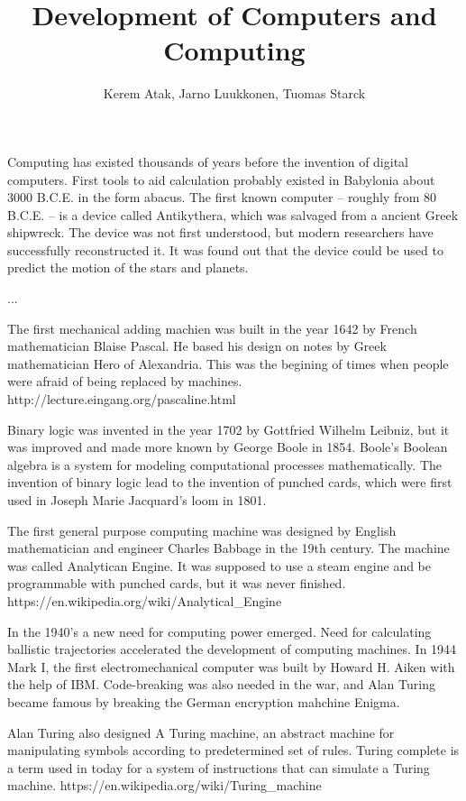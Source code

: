 \documentclass[a4paper,12pt]{article}
\begin{document}
\title{Development of Computers and Computing}
\author{Kerem Atak, Jarno Luukkonen, Tuomas Starck}
\maketitle

Computing has existed thousands of years before the invention of digital computers. First tools to aid calculation probably existed in Babylonia about 3000 B.C.E. in the form abacus\cite{js95}. The first known computer -- roughly from 80 B.C.E. -- is a device called Antikythera, which was salvaged from a ancient Greek shipwreck. The device was not first understood, but modern researchers have successfully reconstructed it. It was found out that the device could be used to predict the motion of the stars and planets\cite{amrp}.

...

The first mechanical adding machien was built in the year 1642 by French mathematician Blaise Pascal. He based his design on notes by Greek mathematician Hero of Alexandria. This was the begining of times when people were afraid of being replaced by machines.  http://lecture.eingang.org/pascaline.html

Binary logic was invented in the year 1702 by Gottfried Wilhelm Leibniz, but it was improved and made more known by George Boole in 1854. Boole's Boolean algebra is a system for modeling computational processes mathematically. The invention of binary logic lead to the invention of punched cards, which were first used in Joseph Marie Jacquard's loom in 1801.

The first general purpose computing machine was designed by English mathematician and engineer Charles Babbage in the 19th century. The machine was called Analytican Engine. It was supposed to use a steam engine and be programmable with punched cards, but it was never finished. https://en.wikipedia.org/wiki/Analytical\_Engine

In the 1940's a new need for computing power emerged. Need for calculating ballistic trajectories accelerated the development of computing machines. In 1944 Mark I, the first electromechanical computer was built by Howard H. Aiken with the help of IBM. Code-breaking was also needed in the war, and Alan Turing became famous by breaking the German encryption mahchine Enigma.

Alan Turing also designed A Turing machine, an abstract machine for manipulating symbols according to predetermined set of rules. Turing complete is a term used in today for a system of instructions that can simulate a Turing machine. https://en.wikipedia.org/wiki/Turing\_machine
\end{document}
